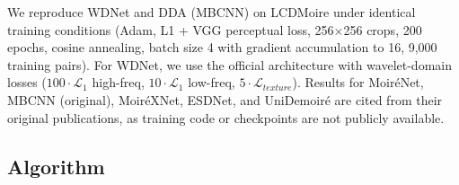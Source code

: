 \documentclass[review,10pt]{elsarticle}
\begin{document}
We reproduce WDNet \cite{liu2020wavelet} and DDA (MBCNN) \cite{zhang2023dda} on LCDMoire under identical training conditions (Adam, L1 + VGG perceptual loss, 256$\times$256 crops, 200 epochs, cosine annealing, batch size 4 with gradient accumulation to 16, 9,000 training pairs). For WDNet, we use the official architecture with wavelet-domain losses ($100\cdot\mathcal{L}_1$ high-freq, $10\cdot\mathcal{L}_1$ low-freq, $5\cdot\mathcal{L}_{texture}$). Results for Moir\'{e}Net, MBCNN (original), Moir\'{e}XNet, ESDNet, and UniDemoir\'{e} are cited from their original publications, as training code or checkpoints are not publicly available.

\subsection{Algorithm}
\end{document}

